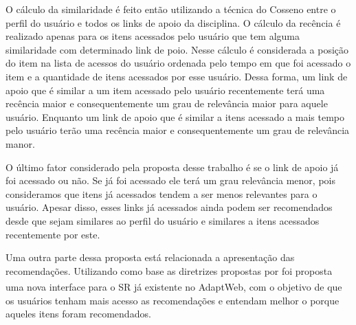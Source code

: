 O cálculo da similaridade é feito então utilizando a técnica do Cosseno entre o perfil do usuário e todos os links de apoio
da disciplina. O cálculo da recência é realizado apenas para os itens acessados pelo usuário que tem alguma similaridade com
determinado link de poio. Nesse cálculo é considerada a posição do item na lista de acessos do usuário ordenada pelo tempo
em que foi acessado o item e a quantidade de itens acessados por esse usuário. Dessa forma, um link de apoio que é similar
a um item acessado pelo usuário recentemente terá uma recência maior e consequentemente um grau de relevância maior para
aquele usuário. Enquanto um link de apoio que é similar a itens acessado a mais tempo pelo usuário terão uma recência maior
e consequentemente um grau de relevância manor.

O último fator considerado pela proposta desse trabalho é se o link de apoio já foi acessado ou não. Se já foi acessado
ele terá um grau relevância menor, pois consideramos que itens já acessados tendem a ser menos relevantes para o usuário.
Apesar disso, esses links já acessados ainda podem ser recomendados desde que sejam similares ao perfil do usuário e similares
a itens acessados recentemente por este.

Uma outra parte dessa proposta está relacionada a apresentação das recomendações. Utilizando como base as diretrizes propostas
por  foi proposta uma nova interface para o SR já existente no AdaptWeb\textsuperscript{\textregistered},
com o objetivo de que os usuários tenham mais acesso as recomendações e entendam melhor o porque aqueles itens foram
recomendados.

